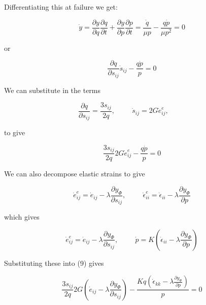 \documentclass[a4paper]{article}
\begin{document}
Differentiating this at failure we get:

\begin{equation}
\dot y =\frac{\partial y}{\partial q}\frac{\partial q}{\partial t}+\frac{\partial y}{\partial p}\frac{\partial p}{\partial t}= \frac{\dot q}{\mu p} -\frac{q\dot p}{\mu p^2} = 0
\end{equation}

or

\begin{equation}
\frac{\partial q}{\partial s_{ij}}\dot s_{ij} -\frac{q\dot p}{p} = 0
\end{equation}

We can substitute in the terms

\begin{equation}
\frac{\partial q}{\partial s_{ij}} = \frac{3s_{ij}}{2q},\hspace{1cm}
\dot s_{ij} = 2G\dot e_{ij}^e,\hspace{1cm}
\end{equation}

to give

\begin{equation}
\frac{3s_{ij}}{2q}2G\dot e_{ij}^e -\frac{q\dot p}{p} = 0
\end{equation}

We can also decompose elastic strains to give

\begin{equation}
\dot e^e_{ij} = \dot e_{ij} - \lambda\frac{\partial y_\Phi}{\partial s_{ij}},\hspace{1cm}
\dot \epsilon^e_{ii} = \dot\epsilon_{ii} - \lambda\frac{\partial y_\Phi}{\partial p}
\end{equation}

which gives

\begin{equation}
\dot e^e_{ij} = \dot e_{ij} - \lambda\frac{\partial y_\Phi}{\partial s_{ij}},\hspace{1cm}
\dot p = K(\dot\epsilon_{ii} - \lambda\frac{\partial y_\Phi}{\partial p})
\end{equation}

Substituting these into (9) gives

\begin{equation}
\frac{3s_{ij}}{2q}2G(\dot e_{ij} - \lambda\frac{\partial y_\Phi}{\partial s_{ij}}) -\frac{Kq(\dot\epsilon_{kk} - \lambda\frac{\partial y_\Phi}{\partial p})}{p} = 0
\end{equation}
\end{document}
